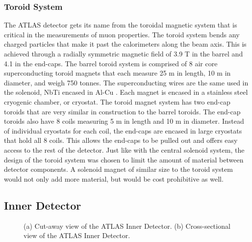 	\subsubsection{Toroid System}\label{sssec:toroid}
		The \gls{ATLAS} detector gets its name from the toroidal magnetic system that is critical in the measurements of muon properties. The toroid system bends any charged particles that make it past the calorimeters along the beam axis. This is achieved through a radially symmetric magnetic field of 3.9 T in the barrel and 4.1 in the end-caps. The barrel toroid system is comprised of 8 air core superconducting toroid magnets that each measure 25 m in length, 10 m in diameter, and weigh 750 tonnes. The superconducting wires are the same used in the solenoid, NbTi encased in Al-Cu \cite{atlas-toroid}. Each magnet is encased in a stainless steel cryogenic chamber, or cryostat. The toroid magnet system has two end-cap toroids that are very similar in construction to the barrel toroids. The end-cap toroids also have 8 coils measuring 5 m in length and 10 m in diameter. Instead of individual cryostats for each coil, the end-caps are encased in large cryostats that hold all 8 coils. This allows the end-caps to be pulled out and offers easy access to the rest of the detector. Just like with the central solenoid system, the design of the toroid system was chosen to limit the amount of material between detector components. A solenoid magnet of similar size to the toroid system would not only add more material, but would be cost prohibitive as well.


	\subsection{Inner Detector}\label{ssec:ID}
		\begin{figure}[!ht]
		\centering
		\caption{\label{fig:ATLAS-ID} (a) Cut-away view of the \gls{ATLAS} Inner Detector. (b) Cross-sectional view of the ATLAS Inner Detector. \cite{atlas-schematics}}
		\end{figure}

